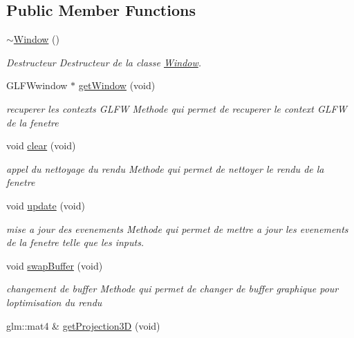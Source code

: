 \subsection*{Public Member Functions}
\begin{DoxyCompactItemize}
\item 
\mbox{\hyperlink{class_beer_engine_1_1_window_a3ae0fe522cf721377047b1027d591d33}{$\sim$\+Window}} ()
\begin{DoxyCompactList}\small\item\em Destructeur Destructeur de la classe \mbox{\hyperlink{class_beer_engine_1_1_window}{Window}}. \end{DoxyCompactList}\item 
G\+L\+F\+Wwindow $\ast$ \mbox{\hyperlink{class_beer_engine_1_1_window_af7a6662e99bb0d07787014adacb8db33}{get\+Window}} (void)
\begin{DoxyCompactList}\small\item\em recuperer les contexts G\+L\+FW Methode qui permet de recuperer le context G\+L\+FW de la fenetre \end{DoxyCompactList}\item 
void \mbox{\hyperlink{class_beer_engine_1_1_window_a7417b4c023c22a9641a1b94cd0cfee93}{clear}} (void)
\begin{DoxyCompactList}\small\item\em appel du nettoyage du rendu Methode qui permet de nettoyer le rendu de la fenetre \end{DoxyCompactList}\item 
void \mbox{\hyperlink{class_beer_engine_1_1_window_abc6524b9b96a88e3427dce738bfe9d4a}{update}} (void)
\begin{DoxyCompactList}\small\item\em mise a jour des evenements Methode qui permet de mettre a jour les evenements de la fenetre telle que les inputs. \end{DoxyCompactList}\item 
void \mbox{\hyperlink{class_beer_engine_1_1_window_a3b2c31a149ed0b90ac292d88f87fd369}{swap\+Buffer}} (void)
\begin{DoxyCompactList}\small\item\em changement de buffer Methode qui permet de changer de buffer graphique pour l\textquotesingle{}optimisation du rendu \end{DoxyCompactList}\item 
glm\+::mat4 \& \mbox{\hyperlink{class_beer_engine_1_1_window_a5f6872e397ddae51b61d0d140d3dca82}{get\+Projection3D}} (void)

\end{DoxyCompactItemize}

